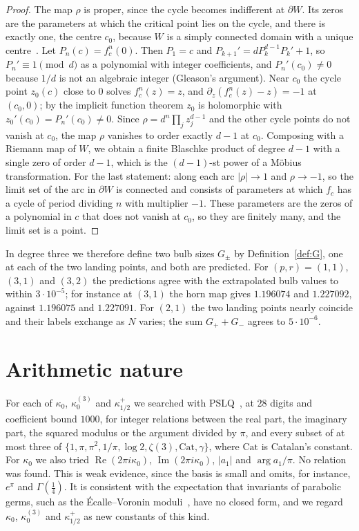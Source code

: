 \documentclass[11pt]{amsart}
\theoremstyle{definition}
\theoremstyle{remark}
\begin{document}
\begin{proof}
The map $\rho$ is proper, since the cycle becomes indifferent at $\partial W$. Its zeros are the parameters at which the critical point lies on the cycle, and there is exactly one, the centre $c_0$, because $W$ is a simply connected domain with a unique centre~\cite{MilnorHC}. Let $P_n(c)=f_c^n(0)$. Then $P_1=c$ and $P_{k+1}'=dP_k^{d-1}P_k'+1$, so $P_n'\equiv1\pmod d$ as a polynomial with integer coefficients, and $P_n'(c_0)\ne0$ because $1/d$ is not an algebraic integer (Gleason's argument). Near $c_0$ the cycle point $z_0(c)$ close to $0$ solves $f_c^n(z)=z$, and $\partial_z(f_c^n(z)-z)=-1$ at $(c_0,0)$; by the implicit function theorem $z_0$ is holomorphic with $z_0'(c_0)=P_n'(c_0)\ne0$. Since $\rho=d^n\prod_jz_j^{d-1}$ and the other cycle points do not vanish at $c_0$, the map $\rho$ vanishes to order exactly $d-1$ at $c_0$. Composing with a Riemann map of $W$, we obtain a finite Blaschke product of degree $d-1$ with a single zero of order $d-1$, which is the $(d-1)$-st power of a M\"obius transformation. For the last statement: along each arc $|\rho|\to1$ and $\rho\to-1$, so the limit set of the arc in $\partial W$ is connected and consists of parameters at which $f_c$ has a cycle of period dividing $n$ with multiplier $-1$. These parameters are the zeros of a polynomial in $c$ that does not vanish at $c_0$, so they are finitely many, and the limit set is a point.
\end{proof}

In degree three we therefore define two bulb sizes $G_\pm$ by Definition~\ref{def:G}, one at each of the two landing points, and both are predicted. For $(p,r)=(1,1)$, $(3,1)$ and $(3,2)$ the predictions agree with the extrapolated bulb values to within $3\cdot10^{-5}$; for instance at $(3,1)$ the horn map gives $1.196074$ and $1.227092$, against $1.196075$ and $1.227091$. For $(2,1)$ the two landing points nearly coincide and their labels exchange as $N$ varies; the sum $G_++G_-$ agrees to $5\cdot10^{-6}$.

\section{Arithmetic nature}\label{sec:pslq}

For each of $\kappa_0$, $\kappa_0^{(3)}$ and $\kappa^+_{1/2}$ we searched with PSLQ~\cite{PSLQ}, at $28$ digits and coefficient bound $1000$, for integer relations between the real part, the imaginary part, the squared modulus or the argument divided by $\pi$, and every subset of at most three of $\{1,\pi,\pi^2,1/\pi,\log2,\zeta(3),\mathrm{Cat},\gamma\}$, where $\mathrm{Cat}$ is Catalan's constant. For $\kappa_0$ we also tried $\operatorname{Re}(2\pi i\kappa_0)$, $\operatorname{Im}(2\pi i\kappa_0)$, $|a_1|$ and $\arg a_1/\pi$. No relation was found. This is weak evidence, since the basis is small and omits, for instance, $e^{\pi}$ and $\Gamma(\frac14)$. It is consistent with the expectation that invariants of parabolic germs, such as the \'Ecalle--Voronin moduli~\cite{Ecalle,Voronin}, have no closed form, and we regard $\kappa_0$, $\kappa_0^{(3)}$ and $\kappa^+_{1/2}$ as new constants of this kind.
\end{document}
